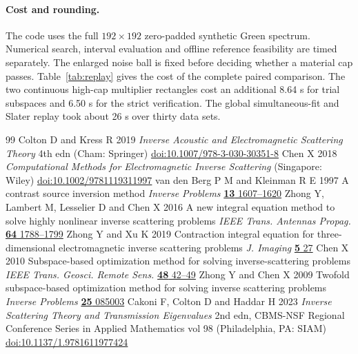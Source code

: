 \documentclass[anonymous,12pt]{iopjournal}
\theoremstyle{remark}\newtheorem{remark}[theorem]{Remark}
\numberwithin{equation}{section}
\begin{document}
\paragraph{Cost and rounding.}
The code uses the full $192\times192$ zero-padded synthetic Green spectrum. Numerical search, interval evaluation and offline reference feasibility are timed separately. The enlarged noise ball is fixed before deciding whether a material cap passes. Table~\ref{tab:replay} gives the cost of the complete paired comparison. The two continuous high-cap multiplier rectangles cost an additional 8.64 s for trial subspaces and 6.50 s for the strict verification. The global simultaneous-fit and Slater replay took about 26 s over thirty data sets. 

\begin{thebibliography}{99}\setlength{\itemsep}{1pt}\setlength{\parsep}{0pt}
 Colton D and Kress R 2019 \emph{Inverse Acoustic and Electromagnetic Scattering Theory} 4th edn (Cham: Springer) \href{https://doi.org/10.1007/978-3-030-30351-8}{doi:10.1007/978-3-030-30351-8}
 Chen X 2018 \emph{Computational Methods for Electromagnetic Inverse Scattering} (Singapore: Wiley) \href{https://doi.org/10.1002/9781119311997}{doi:10.1002/9781119311997}
 van den Berg P M and Kleinman R E 1997 A contrast source inversion method \emph{Inverse Problems} \href{https://doi.org/10.1088/0266-5611/13/6/013}{\textbf{13} 1607--1620}
 Zhong Y, Lambert M, Lesselier D and Chen X 2016 A new integral equation method to solve highly nonlinear inverse scattering problems \emph{IEEE Trans. Antennas Propag.} \href{https://doi.org/10.1109/TAP.2016.2535492}{\textbf{64} 1788--1799}
 Zhong Y and Xu K 2019 Contraction integral equation for three-dimensional electromagnetic inverse scattering problems \emph{J. Imaging} \href{https://doi.org/10.3390/jimaging5020027}{\textbf{5} 27}
 Chen X 2010 Subspace-based optimization method for solving inverse-scattering problems \emph{IEEE Trans. Geosci. Remote Sens.} \href{https://doi.org/10.1109/TGRS.2009.2025122}{\textbf{48} 42--49}
 Zhong Y and Chen X 2009 Twofold subspace-based optimization method for solving inverse scattering problems \emph{Inverse Problems} \href{https://doi.org/10.1088/0266-5611/25/8/085003}{\textbf{25} 085003}
Cakoni F, Colton D and Haddar H 2023 \emph{Inverse Scattering Theory and Transmission Eigenvalues} 2nd edn, CBMS-NSF Regional Conference Series in Applied Mathematics vol 98 (Philadelphia, PA: SIAM) \href{https://doi.org/10.1137/1.9781611977424}{doi:10.1137/1.9781611977424}

\end{thebibliography}
\end{document}
